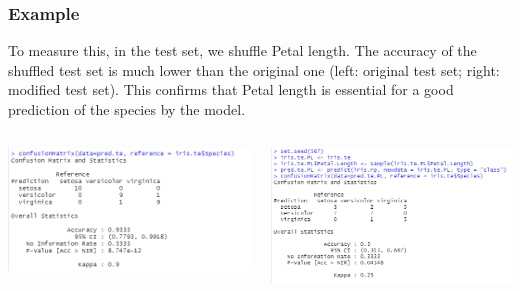 \begin{frame}
\frametitle{Example}
To measure this, in the test set, we shuffle Petal length. The accuracy of the shuffled test set is much lower than the original one (left: original test set; right: modified test set). This confirms that Petal length is essential for a good prediction of the species by the model.\\
\vspace{0.2cm}
\begin{columns}
\begin{column}{0.5\textwidth}
\includegraphics[width=6.5cm]{../Graphs/VarImp_iris_acc_orig.png}
\end{column}
\begin{column}{0.5\textwidth}
\includegraphics[width=6.5cm]{../Graphs/VarImp_iris_acc_PLsh.png}
\end{column}
\end{columns}
\end{frame}
